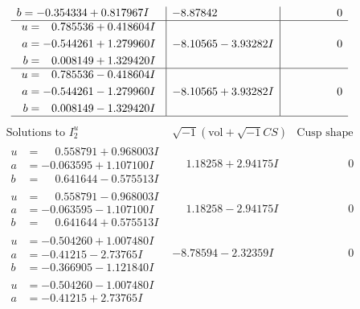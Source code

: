 \documentclass[1p]{elsarticle_modified}
\theoremstyle{definition}
\newcommand{\I}{\sqrt{-1}}
\begin{document}
$$\begin{array}{c|c|c}
\begin{aligned}
b &= -0.354334 + 0.817967 I\end{aligned}
 & -8.87842\phantom{ +0.000000I} & \phantom{-0.000000 } 0 \\ \hline\begin{aligned}
u &= \phantom{-}0.785536 + 0.418604 I \\
a &= -0.544261 + 1.279960 I \\
b &= \phantom{-}0.008149 + 1.329420 I\end{aligned}
 & -8.10565 - 3.93282 I & \phantom{-0.000000 } 0 \\ \hline\begin{aligned}
u &= \phantom{-}0.785536 - 0.418604 I \\
a &= -0.544261 - 1.279960 I \\
b &= \phantom{-}0.008149 - 1.329420 I\end{aligned}
 & -8.10565 + 3.93282 I & \phantom{-0.000000 } 0\\
 \hline 
 \end{array}$$\newpage$$\begin{array}{c|c|c}  
\text{Solutions to }I^u_{2}& \I (\text{vol} + \sqrt{-1}CS) & \text{Cusp shape}\\
 \hline 
\begin{aligned}
u &= \phantom{-}0.558791 + 0.968003 I \\
a &= -0.063595 + 1.107100 I \\
b &= \phantom{-}0.641644 - 0.575513 I\end{aligned}
 & \phantom{-}1.18258 + 2.94175 I & \phantom{-0.000000 } 0 \\ \hline\begin{aligned}
u &= \phantom{-}0.558791 - 0.968003 I \\
a &= -0.063595 - 1.107100 I \\
b &= \phantom{-}0.641644 + 0.575513 I\end{aligned}
 & \phantom{-}1.18258 - 2.94175 I & \phantom{-0.000000 } 0 \\ \hline\begin{aligned}
u &= -0.504260 + 1.007480 I \\
a &= -0.41215 - 2.73765 I \\
b &= -0.366905 - 1.121840 I\end{aligned}
 & -8.78594 - 2.32359 I & \phantom{-0.000000 } 0 \\ \hline\begin{aligned}
u &= -0.504260 - 1.007480 I \\
a &= -0.41215 + 2.73765 I \\

\end{aligned}
\end{array}$$
\end{document}
